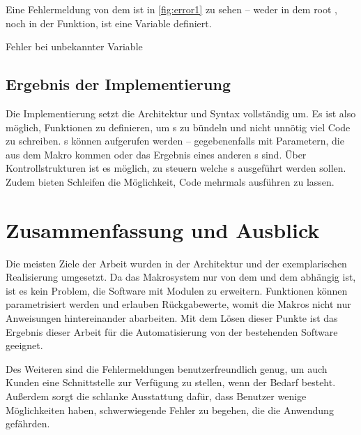     Eine Fehlermeldung von dem  ist in \autoref{fig:error1} zu sehen -- weder in dem root , noch in der  Funktion, ist eine Variable  definiert.
    \begin{myCodeEnv}
      \centering
      \begin{myInvBox}[width=.9\linewidth]
        
      \end{myInvBox}
      \caption{Fehler bei unbekannter Variable}
      \label{fig:error1}
    \end{myCodeEnv}

  \subsection{Ergebnis der Implementierung}
  \label{ssec:Ergebnis der Implementierung}
    Die Implementierung setzt die Architektur und Syntax vollständig um. Es ist also möglich, Funktionen zu definieren, um s zu bündeln und nicht unnötig viel Code zu schreiben. s können aufgerufen werden -- gegebenenfalls mit Parametern, die aus dem Makro kommen oder das Ergebnis eines anderen s sind. Über Kontrollstrukturen ist es möglich, zu steuern welche s ausgeführt werden sollen. Zudem bieten Schleifen die Möglichkeit, Code mehrmals ausführen zu lassen.

\section{Zusammenfassung und Ausblick}
\label{sec:Zusammenfassung und Ausblick}
  Die meisten Ziele der Arbeit wurden in der Architektur und der exemplarischen Realisierung umgesetzt. Da das Makrosystem nur von dem  und dem  abhängig ist, ist es kein Problem, die Software mit Modulen zu erweitern. Funktionen können parametrisiert werden und erlauben Rückgabewerte, womit die Makros nicht nur Anweisungen hintereinander abarbeiten. Mit dem Lösen dieser Punkte ist das Ergebnis dieser Arbeit für die Automatisierung von der bestehenden Software geeignet.

  Des Weiteren sind die Fehlermeldungen benutzerfreundlich genug, um auch Kunden eine Schnittstelle zur Verfügung zu stellen, wenn der Bedarf besteht. Außerdem sorgt die schlanke Ausstattung dafür, dass Benutzer wenige Möglichkeiten haben, schwerwiegende Fehler zu begehen, die die Anwendung gefährden.

